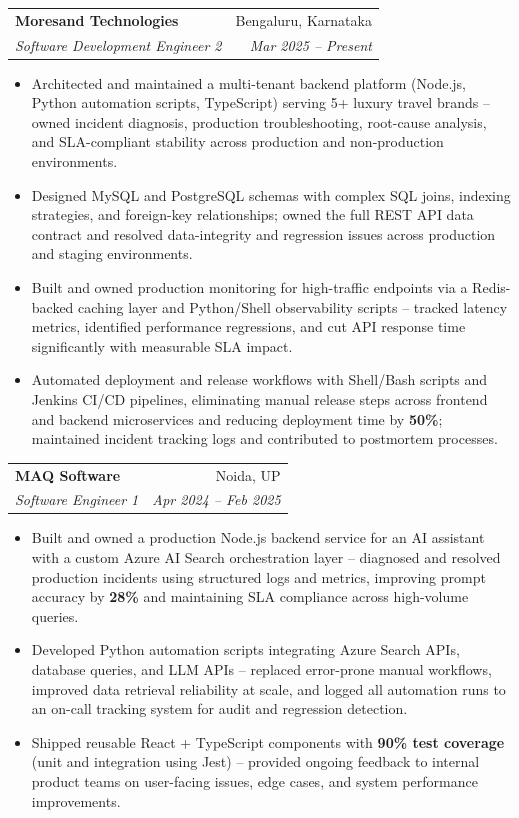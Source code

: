 \documentclass[a4paper,20pt]{article}
\makeatletter
\newcommand{\resumeSubheading}[4]{\vspace{-1pt}\item\begin{tabular*}{0.97\textwidth}{l@{\extracolsep{\fill}}r}\textbf{#1} & #2 \\\textit{#3} & \textit{#4} \\\end{tabular*}\vspace{-5pt}}
\newcommand{\resumeItemListStart}{\begin{itemize}}
\newcommand{\resumeItemListEnd}{\end{itemize}\vspace{-5pt}}
\makeatother
\begin{document}
    \resumeSubheading
      {Moresand Technologies}{Bengaluru, Karnataka}
      {Software Development Engineer 2}{Mar 2025 -- Present}
      \resumeItemListStart
        \item\small{Architected and maintained a multi-tenant backend platform (Node.js, Python automation scripts, TypeScript) serving 5+ luxury travel brands -- owned incident diagnosis, production troubleshooting, root-cause analysis, and SLA-compliant stability across production and non-production environments.}
        \item\small{Designed MySQL and PostgreSQL schemas with complex SQL joins, indexing strategies, and foreign-key relationships; owned the full REST API data contract and resolved data-integrity and regression issues across production and staging environments.}
        \item\small{Built and owned production monitoring for high-traffic endpoints via a Redis-backed caching layer and Python/Shell observability scripts -- tracked latency metrics, identified performance regressions, and cut API response time significantly with measurable SLA impact.}
        \item\small{Automated deployment and release workflows with Shell/Bash scripts and Jenkins CI/CD pipelines, eliminating manual release steps across frontend and backend microservices and reducing deployment time by \textbf{50\%}; maintained incident tracking logs and contributed to postmortem processes.}
      \resumeItemListEnd

    \resumeSubheading
      {MAQ Software}{Noida, UP}
      {Software Engineer 1}{Apr 2024 -- Feb 2025}
      \resumeItemListStart
        \item\small{Built and owned a production Node.js backend service for an AI assistant with a custom Azure AI Search orchestration layer -- diagnosed and resolved production incidents using structured logs and metrics, improving prompt accuracy by \textbf{28\%} and maintaining SLA compliance across high-volume queries.}
        \item\small{Developed Python automation scripts integrating Azure Search APIs, database queries, and LLM APIs -- replaced error-prone manual workflows, improved data retrieval reliability at scale, and logged all automation runs to an on-call tracking system for audit and regression detection.}
        \item\small{Shipped reusable React + TypeScript components with \textbf{90\% test coverage} (unit and integration using Jest) -- provided ongoing feedback to internal product teams on user-facing issues, edge cases, and system performance improvements.}
      \resumeItemListEnd
\end{document}
